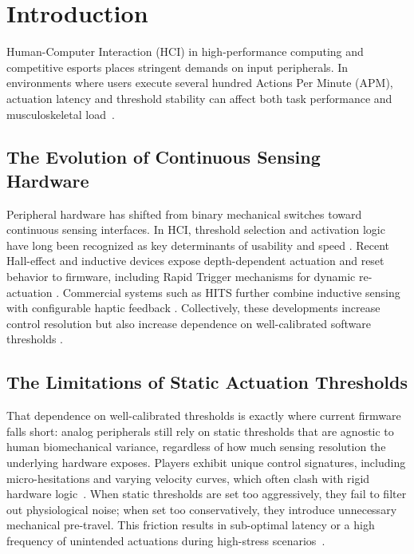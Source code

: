 \chapter{Introduction}
\label{chap:introduction}

Human-Computer Interaction (HCI) in high-performance computing and competitive esports places stringent demands on input peripherals. In environments where users execute several hundred Actions Per Minute (APM), actuation latency and threshold stability can affect both task performance and musculoskeletal load~\cite{esports_tendinopathy, wrist_fatigue_genre_2025}.

\section{The Evolution of Continuous Sensing Hardware}
Peripheral hardware has shifted from binary mechanical switches toward continuous sensing interfaces. In HCI, threshold selection and activation logic have long been recognized as key determinants of usability and speed \cite{touchpad_comparison, impact2018}. Recent Hall-effect and inductive devices expose depth-dependent actuation and reset behavior to firmware, including Rapid Trigger mechanisms for dynamic re-actuation \cite{wooting_rapid_trigger, pcgamer_hall_effect}. Commercial systems such as HITS further combine inductive sensing with configurable haptic feedback \cite{logitech_superstrike_2026, logitech_hits_patent, fox_superstrike_2026, techradar_superstrike_2026, logitech_hits_official}. Collectively, these developments increase control resolution but also increase dependence on well-calibrated software thresholds \cite{dynamic_keyboard, attackshark_taphold, qmk_tap_hold}.

\section{The Limitations of Static Actuation Thresholds}
That dependence on well-calibrated thresholds is exactly where current firmware falls short: analog peripherals still rely on static thresholds that are agnostic to human biomechanical variance, regardless of how much sensing resolution the underlying hardware exposes. Players exhibit unique control signatures, including micro-hesitations and varying velocity curves, which often clash with rigid hardware logic~\cite{impact2018}. When static thresholds are set too aggressively, they fail to filter out physiological noise; when set too conservatively, they introduce unnecessary mechanical pre-travel. This friction results in sub-optimal latency or a high frequency of unintended actuations during high-stress scenarios~\cite{touchpad_comparison, dynamic_keyboard}.

